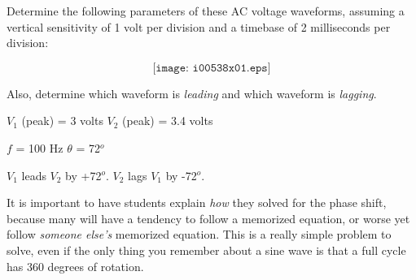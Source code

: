 

Determine the following parameters of these AC voltage waveforms, assuming a vertical sensitivity of 1 volt per division and a timebase of 2 milliseconds per division:

$$\texttt{[image: i00538x01.eps]}$$

Also, determine which waveform is {\it leading} and which waveform is {\it lagging}.







$V_{1}$ (peak) = 3 volts \hskip 100pt $V_{2}$ (peak) = 3.4 volts

\vskip 10pt

$f$ = 100 Hz \hskip 100pt $\theta$ = 72$^{o}$

\vskip 10pt

$V_1$ leads $V_2$ by +72$^{o}$.  $V_2$ lags $V_1$ by -72$^{o}$.







It is important to have students explain {\it how} they solved for the phase shift, because many will have a tendency to follow a memorized equation, or worse yet follow {\it someone else's} memorized equation.  This is a really simple problem to solve, even if the only thing you remember about a sine wave is that a full cycle has 360 degrees of rotation.




